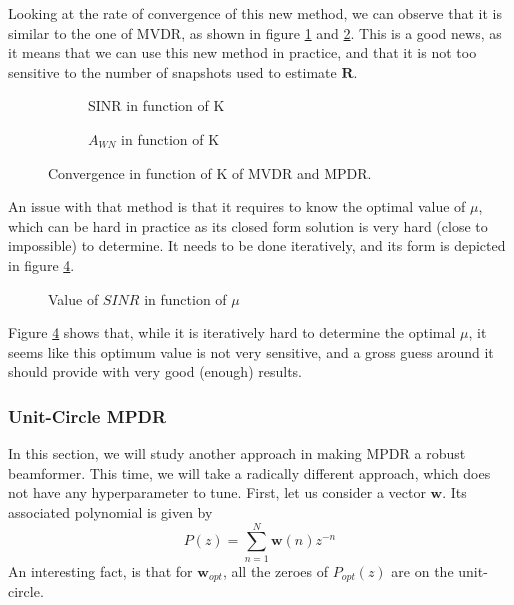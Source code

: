 \documentclass[12pt]{article}
\begin{document}
Looking at the rate of convergence of this new method, we can observe that it is similar to the one of MVDR, as shown in figure \ref{fig:robust_k_sinr} and \ref{fig:robust_k_awn}. This is a good news, as it means that we can use this new method in practice, and that it is not too sensitive to the number of snapshots used to estimate $\mathbf{R}$.
\begin{figure}[H]
    \centering
    \begin{subfigure}[b]{0.4\linewidth}
        
        \caption{SINR in function of K}
        \label{fig:robust_k_sinr}
    \end{subfigure}\hspace{0.09\linewidth}
    \begin{subfigure}[b]{0.4\linewidth}
        
        \caption{$A_{WN}$ in function of K}
        \label{fig:robust_k_awn}
    \end{subfigure}
    \caption{Convergence in function of K of MVDR and MPDR.}
    \label{fig:mpdr_robust_k}
\end{figure}
An issue with that method is that it requires to know the optimal value of $\mu$, which can be hard in practice as its closed form solution is very hard (close to impossible) to determine. It needs to be done iteratively, and its form is depicted in figure \ref{fig:mu}. 
\begin{figure}[H]
    \centering
    
    \caption{Value of $SINR$ in function of $\mu$}
    \label{fig:mu}
\end{figure}
Figure \ref{fig:mu} shows that, while it is iteratively hard to determine the optimal $\mu$, it seems like this optimum value is not very sensitive, and a gross guess around it should provide with very good (enough) results. 
\subsubsection{Unit-Circle MPDR}
In this section, we will study another approach in making MPDR a robust beamformer. This time, we will take a radically different approach, which does not have any hyperparameter to tune. First, let us consider a vector $\mathbf{w}$. Its associated polynomial is given by
\begin{equation}
    P(z)=\sum_{n=1}^N \mathbf{w}(n)z^{-n}
\end{equation}
An interesting fact, is that for $\mathbf{w}_{opt}$, all the zeroes of $P_{opt}(z)$ are on the unit-circle. 
\end{document}
